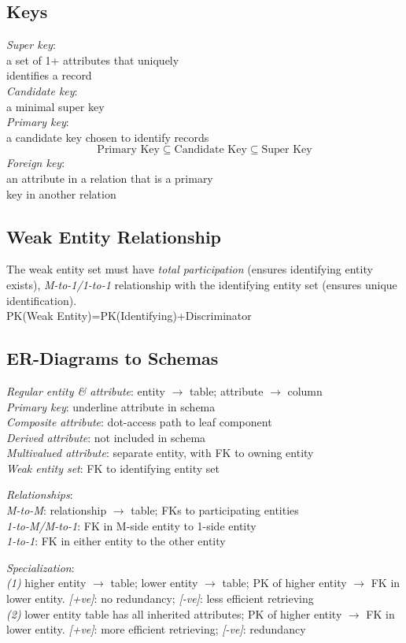 \subsection*{Keys}

\emph{Super key}:\\\ind a set of 1+ attributes that uniquely\\\ind identifies a record\\
\emph{Candidate key}:\\\ind a minimal super key\\
\emph{Primary key}:\\\ind a candidate key chosen to identify records\\
\[
    \text{Primary Key} \subseteq \text{Candidate Key} \subseteq \text{Super Key}
\]
\emph{Foreign key}:\\\ind an attribute in a relation that is a primary\\\ind key in another relation\\

\subsection*{Weak Entity Relationship}

The weak entity set must have \emph{total participation} (ensures identifying entity exists), \emph{M-to-1/1-to-1} relationship with the identifying entity set (ensures unique identification).\\
{\hfill PK(Weak Entity)=PK(Identifying)+Discriminator \hfill}

\subsection*{ER-Diagrams to Schemas}
\emph{Regular entity \& attribute}: entity $\to$ table; attribute $\to$ column\\
\emph{Primary key}: underline attribute in schema\\
\emph{Composite attribute}: dot-access path to leaf component\\
\emph{Derived attribute}: not included in schema\\
\emph{Multivalued attribute}: separate entity, with FK to owning entity\\
\emph{Weak entity set}: FK to identifying entity set

\emph{Relationships}:\\
\ind\emph{M-to-M}: relationship $\to$ table; FKs to participating entities\\
\ind\emph{1-to-M/M-to-1}: FK in M-side entity to 1-side entity\\
\ind\emph{1-to-1}: FK in either entity to the other entity

\emph{Specialization}:\\
\ind\emph{(1)} higher entity $\to$ table; lower entity $\to$ table; PK of higher entity $\to$ FK in lower entity. \emph{[+ve]}: no redundancy; \emph{[-ve]}: less efficient retrieving\\
\ind\emph{(2)} lower entity table has all inherited attributes; PK of higher entity $\to$ FK in lower entity. \emph{[+ve]}: more efficient retrieving; \emph{[-ve]}: redundancy\\